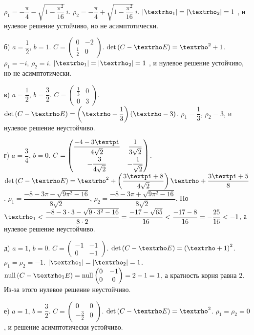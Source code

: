 \documentclass[a5paper,10pt]{article}
\begin{document}
$\rho_{1} = -\dfrac {\pi} {4} - \sqrt{1 - \dfrac {\pi^2} {16}}\ i$.
$\rho_{2} = -\dfrac {\pi} {4} + \sqrt{1 - \dfrac {\pi^2} {16}}\ i$.
$\vbr{\rho_{1}} = \vbr{\rho_{2}} = 1$ \vspace{2mm}, и нулевое решение устойчиво, но не асимптотически.

б) $a = \dfrac {1} {2}$, $b = 1$.
$C = \begin{pmatrix} 0 & -2 \\ \frac {1} {2} & 0 \end{pmatrix}$.
$\det\br{C - \rho E} = \rho^2 + 1$.
$\rho_{1} = -i$,
$\rho_{2} = i$.
$\vbr{\rho_{1}} = \vbr{\rho_{2}} = 1$ \vspace{2mm}, и нулевое решение устойчиво, но не асимптотически.

в) $a = \dfrac {1} {2}$, $b = \dfrac {3} {2}$.
$C = \begin{pmatrix} \frac {1} {3} & 0 \\ 0 & 3 \end{pmatrix}$.
$\det\br{C - \rho E} = \br{\rho - \dfrac {1} {3}} \br{\rho - 3}$.
$\rho_{1} = \dfrac {1} {3}$, $\rho_{2} = 3$, и нулевое решение неустойчиво.

г) $a = \dfrac {3} {4}$, $b = 0$.
$C = \begin{pmatrix} \vspace{1mm} \dfrac {-4 - 3\pi} {4\sqrt{2}} & \dfrac {1} {3\sqrt{2}} \\ -\dfrac {3} {4\sqrt{2}} & -\dfrac {1} {\sqrt{2}} \end{pmatrix}$.
$\det\br{C - \rho E} = \rho^2 + \br{\dfrac {3\pi + 8} {4\sqrt{2}}}\rho + \dfrac {3\pi + 5} {8}$. 
$\rho_{1} = \dfrac {-8 - 3\pi - \sqrt{9\pi^2 - 16}} {8\sqrt{2}}$,
$\rho_{2} = \dfrac {-8 - 3\pi + \sqrt{9\pi^2 - 16}} {8\sqrt{2}}$.
Но $\rho_{1} < \dfrac {-8 - 3 \cdot 3 - \sqrt{9 \cdot 3^2 - 16}} {8 \cdot 2} \linebreak 
= \dfrac {-17 - \sqrt{65}} {16} < \dfrac {-17 - 8} {16} = -\dfrac {25} {16} < -1$, а нулевое решение неустойчиво.

д) $a = 1$, $b = 0$. 
$C = \begin{pmatrix} -1 & -1 \\ 0 & -1 \end{pmatrix}$.
$\det\br{C - \rho E} = \br{\rho + 1}^2$.
$\rho_{1} = \rho_{2} = -1$.
$\vbr{\rho_{1}} = \vbr{\rho_{2}} = 1$.
$\nullity\br{C - \rho_{1} E} = \nullity \begin{pmatrix}0 & -1 \\ 0 & 0 \end{pmatrix} = 2 - 1 = 1$, а кратность корня равна $2$. Из-за этого нулевое решение неустойчиво.

е) $a = 1$, $b = \dfrac {3} {2}$.
$C = \begin{pmatrix} 0 & 0 \\ -\frac {3} {2} & 0 \end{pmatrix}$.
$\det\br{C - \rho E} = \rho^2$. $\rho_{1} = \rho_{2} = 0$, и решение асимптотически устойчиво.
\end{document}
